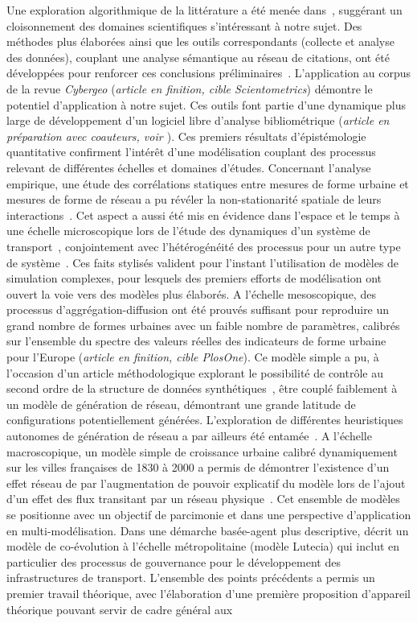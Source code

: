 Une exploration algorithmique de la littérature a été menée dans~\cite{raimbault2015models}, suggérant un cloisonnement des domaines scientifiques s'intéressant à notre sujet. Des méthodes plus élaborées ainsi que les outils correspondants (collecte et analyse des données), couplant une analyse sémantique au réseau de citations, ont été développées pour renforcer ces conclusions préliminaires~\cite{raimbault2016indirect}. L'application au corpus de la revue \emph{Cybergeo} (\textit{article en finition, cible Scientometrics}) démontre le potentiel d'application à notre sujet. Ces outils font partie d'une dynamique plus large de développement d'un logiciel libre d'analyse bibliométrique (\textit{article en préparation avec coauteurs, voir \cite{cybergeo20}}). Ces premiers résultats d'épistémologie quantitative confirment l'intérêt d'une modélisation couplant des processus relevant de différentes échelles et domaines d'études. Concernant l'analyse empirique, une étude des corrélations statiques entre mesures de forme urbaine et mesures de forme de réseau a pu révéler la non-stationarité spatiale de leurs interactions~\cite{raimbault2016cautious}. Cet aspect a aussi été mis en évidence dans l'espace et le temps à une échelle microscopique lors de l'étude des dynamiques d'un système de transport~\cite{raimbault2016investigating}, conjointement avec l'hétérogénéité des processus pour un autre type de système~\cite{raimbault2015hybrid}. Ces faits stylisés valident pour l'instant l'utilisation de modèles de simulation complexes, pour lesquels des premiers efforts de modélisation ont ouvert la voie vers des modèles plus élaborés. A l'échelle mesoscopique, des processus d'aggrégation-diffusion ont été prouvés suffisant pour reproduire un grand nombre de formes urbaines avec un faible nombre de paramètres, calibrés sur l'ensemble du spectre des valeurs réelles des indicateurs de forme urbaine pour l'Europe (\textit{article en finition, cible PlosOne}). Ce modèle simple a pu, à l'occasion d'un article méthodologique explorant le possibilité de contrôle au second ordre de la structure de données synthétiques~\cite{raimbault2016generation}, être couplé faiblement à un modèle de génération de réseau, démontrant une grande latitude de configurations potentiellement générées. L'exploration de différentes heuristiques autonomes de génération de réseau a par ailleurs été entamée~\cite{raimbault2015labex}. A l'échelle macroscopique, un modèle simple de croissance urbaine calibré dynamiquement sur les villes françaises de 1830 à 2000 a permis de démontrer l'existence d'un effet réseau de par l'augmentation de pouvoir explicatif du modèle lors de l'ajout d'un effet des flux transitant par un réseau physique~\cite{raimbault2016models}. Cet ensemble de modèles se positionne avec un objectif de parcimonie et dans une perspective d'application en multi-modélisation. Dans une démarche basée-agent plus descriptive, \cite{le2015modeling} décrit un modèle de co-évolution à l'échelle métropolitaine (modèle Lutecia) qui inclut en particulier des processus de gouvernance pour le développement des infrastructures de transport. L'ensemble des points précédents a permis un premier travail théorique, avec l'élaboration d'une première proposition d'appareil théorique pouvant servir de cadre général aux 